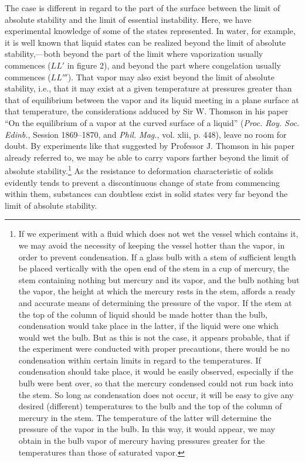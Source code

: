 \documentclass[11pt]{article}
\begin{document}
The case is different in regard to the part of the surface between the limit of absolute stability and the limit of essential instability. Here, we have experimental knowledge of some of the states represented. In water, for example, it is well known that liquid states can be realized beyond the limit of absolute stability,---both beyond the part of the limit where vaporization usually commences ($LL'$ in figure 2), and beyond the part where congelation usually commences ($LL'''$). That vapor may also exist beyond the limit of absolute stability, i.e., that it may exist at a given temperature at pressures greater than that of equilibrium between the vapor and its liquid meeting in a plane surface at that temperature, the considerations adduced by Sir W. Thomson in his paper ``On the equilibrium of a vapor at the curved surface of a liquid'' (\emph{Proc. Roy. Soc. Edinb.}, Session 1869--1870, and \emph{Phil. Mag.}, vol. xlii, p. 448), leave no room for doubt. By experiments like that suggested by Professor J. Thomson in his paper already referred to, we may be able to carry vapors farther beyond the limit of absolute stability.\footnote{If we experiment with a fluid which does not wet the vessel which contains it, we may avoid the necessity of keeping the vessel hotter than the vapor, in order to prevent condensation. If a glass bulb with a stem of sufficient length be placed vertically with the open end of the stem in a cup of mercury, the stem containing nothing but mercury and its vapor, and the bulb nothing but the vapor, the height at which the mercury rests in the stem, affords a ready and accurate means of determining the pressure of the vapor. If the stem at the top of the column of liquid should be made hotter than the bulb, condensation would take place in the latter, if the liquid were one which would wet the bulb. But as this is not the case, it appears probable, that if the experiment were conducted with proper precautions, there would be no condensation within certain limits in regard to the temperatures. If condensation should take place, it would be easily observed, especially if the bulb were bent over, so that the mercury condensed could not run back into the stem. So long as condensation does not occur, it will be easy to give any desired (different) temperatures to the bulb and the top of the column of mercury in the stem. The temperature of the latter will determine the pressure of the vapor in the bulb. In this way, it would appear, we may obtain in the bulb vapor of mercury having pressures greater for the temperatures than those of saturated vapor.} As the resistance to deformation characteristic of solids evidently tends to prevent a discontinuous change of state from commencing within them, substances can doubtless exist in solid states very far beyond the limit of absolute stability.
\end{document}
